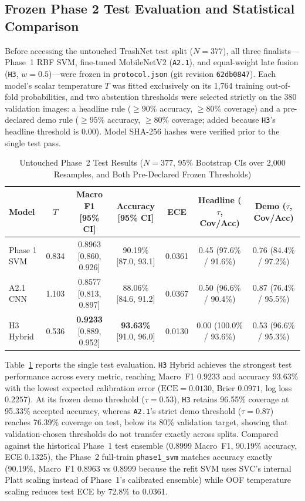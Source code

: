 
\subsection{Frozen Phase 2 Test Evaluation and Statistical Comparison}
\label{sec:phase2_eval}
Before accessing the untouched TrashNet test split ($N=377$), all three finalists---Phase~1 RBF SVM, fine-tuned MobileNetV2 (\texttt{A2.1}), and equal-weight late fusion (\texttt{H3}, $w=0.5$)---were frozen in \texttt{protocol.json} (git revision \texttt{62db0847}). Each model's scalar temperature $T$ was fitted exclusively on its 1,764 training out-of-fold probabilities, and two abstention thresholds were selected strictly on the 380 validation images: a headline rule ($\ge 90\%$ accuracy, $\ge 80\%$ coverage) and a pre-declared demo rule ($\ge 95\%$ accuracy, $\ge 80\%$ coverage; added because \texttt{H3}'s headline threshold is $0.00$). Model SHA-256 hashes were verified prior to the single test pass.

\begin{table}[t]
\caption{Untouched Phase~2 Test Results ($N=377$, 95\% Bootstrap CIs over 2,000 Resamples, and Both Pre-Declared Frozen Thresholds)}
\label{tab:phase2_main}\centering
\begin{tabular}{lcccccc}\toprule
Model & $T$ & Macro F1 [95\% CI] & Accuracy [95\% CI] & ECE & Headline ($\tau$, Cov/Acc) & Demo ($\tau$, Cov/Acc)\\\midrule
Phase 1 SVM & 0.834 & 0.8963 [0.860, 0.926] & 90.19\% [87.0, 93.1] & 0.0361 & 0.45 (97.6\% / 91.6\%) & 0.76 (84.4\% / 97.2\%)\\
A2.1 CNN & 1.103 & 0.8577 [0.813, 0.897] & 88.06\% [84.6, 91.2] & 0.0367 & 0.50 (96.6\% / 90.4\%) & 0.87 (76.4\% / 95.5\%)\\
H3 Hybrid & 0.536 & \textbf{0.9233} [0.889, 0.952] & \textbf{93.63\%} [91.0, 96.0] & 0.0130 & 0.00 (100.0\% / 93.6\%) & 0.53 (96.6\% / 95.3\%)\\
\bottomrule
\end{tabular}
\end{table}

Table~\ref{tab:phase2_main} reports the single test evaluation. \texttt{H3} Hybrid achieves the strongest test performance across every metric, reaching Macro~F1 $\mathbf{0.9233}$ and accuracy $\mathbf{93.63\%}$ with the lowest expected calibration error ($\mathrm{ECE}=0.0130$, Brier $0.0971$, log loss $0.2257$). At its frozen demo threshold ($\tau=0.53$), \texttt{H3} retains 96.55\% coverage at 95.33\% accepted accuracy, whereas \texttt{A2.1}'s strict demo threshold ($\tau=0.87$) reaches 76.39\% coverage on test, below its 80\% validation target, showing that validation-chosen thresholds do not transfer exactly across splits. Compared against the historical Phase~1 test ensemble (0.8999 Macro~F1, 90.19\% accuracy, ECE 0.1325), the Phase~2 full-train \texttt{phase1\_svm} matches accuracy exactly (90.19\%, Macro~F1 0.8963 vs 0.8999 because the refit SVM uses SVC's internal Platt scaling instead of Phase~1's calibrated ensemble) while OOF temperature scaling reduces test ECE by 72.8\% to 0.0361.

